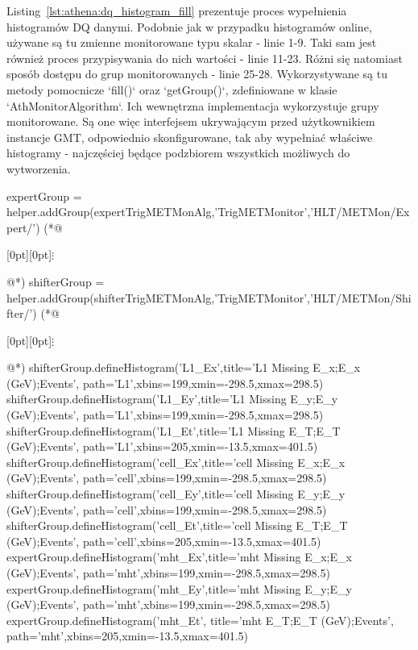 Listing~\ref{lst:athena:dq_histogram_fill} prezentuje proces wypełnienia histogramów DQ danymi.
Podobnie jak w przypadku histogramów online, używane są tu zmienne monitorowane typu skalar - linie 1-9. 
Taki sam jest również proces przypisywania do nich wartości - linie 11-23.
Różni się natomiast sposób dostępu do grup monitorowanych - linie 25-28.
Wykorzystywane są tu metody pomocnicze `fill()` oraz `getGroup()`, zdefiniowane w klasie `AthMonitorAlgorithm`.
Ich wewnętrzna implementacja wykorzystuje grupy monitorowane.
Są one więc interfejsem ukrywającym przed użytkownikiem instancje GMT, odpowiednio skonfigurowane, tak aby wypełniać właściwe histogramy - najczęściej będące podzbiorem wszystkich możliwych do wytworzenia. 

\begin{python}[caption={Fragment kodu konfiguracji Athena Python~\cite{offline-declaration}, zawierającego deklarację histogramów na potrzeby monitoringu DQ offline.}, label={lst:athena:dq_histogram_declaration}]
expertGroup = helper.addGroup(expertTrigMETMonAlg,'TrigMETMonitor','HLT/METMon/Expert/')
(*@\centerline{\raisebox{-1pt}[0pt][0pt]{$\vdots$}}@*)
shifterGroup = helper.addGroup(shifterTrigMETMonAlg,'TrigMETMonitor','HLT/METMon/Shifter/')
(*@\centerline{\raisebox{-1pt}[0pt][0pt]{$\vdots$}}@*)
shifterGroup.defineHistogram('L1_Ex',title='L1 Missing E_{x};E_{x} (GeV);Events',
                            path='L1',xbins=199,xmin=-298.5,xmax=298.5)
shifterGroup.defineHistogram('L1_Ey',title='L1 Missing E_{y};E_{y} (GeV);Events',
                            path='L1',xbins=199,xmin=-298.5,xmax=298.5)
shifterGroup.defineHistogram('L1_Et',title='L1 Missing E_{T};E_{T} (GeV);Events',
                            path='L1',xbins=205,xmin=-13.5,xmax=401.5)
shifterGroup.defineHistogram('cell_Ex',title='cell Missing E_{x};E_{x} (GeV);Events',
                            path='cell',xbins=199,xmin=-298.5,xmax=298.5)
shifterGroup.defineHistogram('cell_Ey',title='cell Missing E_{y};E_{y} (GeV);Events',
                            path='cell',xbins=199,xmin=-298.5,xmax=298.5)
shifterGroup.defineHistogram('cell_Et',title='cell Missing E_{T};E_{T} (GeV);Events',
                            path='cell',xbins=205,xmin=-13.5,xmax=401.5)
expertGroup.defineHistogram('mht_Ex',title='mht Missing E_{x};E_{x} (GeV);Events',
                         path='mht',xbins=199,xmin=-298.5,xmax=298.5)
expertGroup.defineHistogram('mht_Ey',title='mht Missing E_{y};E_{y} (GeV);Events',
                         path='mht',xbins=199,xmin=-298.5,xmax=298.5)
expertGroup.defineHistogram('mht_Et', title='mht E_{T};E_{T} (GeV);Events',
                            path='mht',xbins=205,xmin=-13.5,xmax=401.5)
\end{python}

